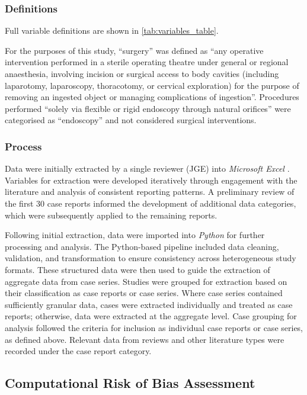 \subsubsection{Definitions}
Full variable definitions are shown in \ref{tab:variables_table}.

For the purposes of this study, \enquote{surgery} was defined as \enquote{any operative intervention performed in a sterile operating theatre under general or regional anaesthesia, involving incision or surgical access to body cavities (including laparotomy, laparoscopy, thoracotomy, or cervical exploration) for the purpose of removing an ingested object or managing complications of ingestion}. Procedures performed \enquote{solely via flexible or rigid endoscopy through natural orifices} were categorised as \enquote{endoscopy} and not considered surgical interventions.

\subsubsection{Process}

Data were initially extracted by a single reviewer (JGE) into \textit{Microsoft Excel} \cite{MicrosoftCorporation_2025}. Variables for extraction were developed iteratively through engagement with the literature and analysis of consistent reporting patterns. A preliminary review of the first 30 case reports informed the development of additional data categories, which were subsequently applied to the remaining reports. 

Following initial extraction, data were imported into \textit{Python} \cite{PythonSoftwareFoundation_2025} for further processing and analysis. The Python-based pipeline included data cleaning, validation, and transformation to ensure consistency across heterogeneous study formats. These structured data were then used to guide the extraction of aggregate data from case series. Studies were grouped for extraction based on their classification as case reports or case series. Where case series contained sufficiently granular data, cases were extracted individually and treated as case reports; otherwise, data were extracted at the aggregate level. Case grouping for analysis followed the criteria for inclusion as individual case reports or case series, as defined above. Relevant data from reviews and other literature types were recorded under the case report category.

\subsection{Computational Risk of Bias Assessment}
\label{appendix:bias}

